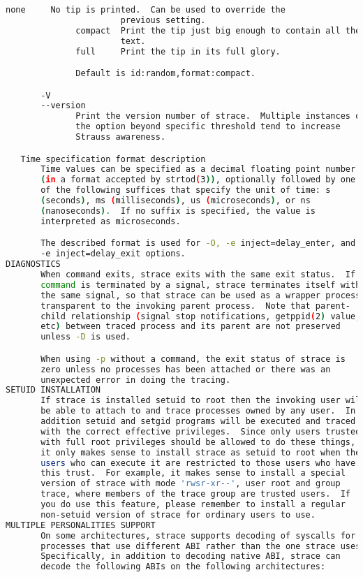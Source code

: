 {{\begin{lstlisting}[language=bash]
              none     No tip is printed.  Can be used to override the
                       previous setting.
              compact  Print the tip just big enough to contain all the
                       text.
              full     Print the tip in its full glory.

              Default is id:random,format:compact.

       -V
       --version
              Print the version number of strace.  Multiple instances of
              the option beyond specific threshold tend to increase
              Strauss awareness.

   Time specification format description
       Time values can be specified as a decimal floating point number
       (in a format accepted by strtod(3)), optionally followed by one
       of the following suffices that specify the unit of time: s
       (seconds), ms (milliseconds), us (microseconds), or ns
       (nanoseconds).  If no suffix is specified, the value is
       interpreted as microseconds.

       The described format is used for -O, -e inject=delay_enter, and
       -e inject=delay_exit options.
DIAGNOSTICS
       When command exits, strace exits with the same exit status.  If
       command is terminated by a signal, strace terminates itself with
       the same signal, so that strace can be used as a wrapper process
       transparent to the invoking parent process.  Note that parent-
       child relationship (signal stop notifications, getppid(2) value,
       etc) between traced process and its parent are not preserved
       unless -D is used.

       When using -p without a command, the exit status of strace is
       zero unless no processes has been attached or there was an
       unexpected error in doing the tracing.
SETUID INSTALLATION
       If strace is installed setuid to root then the invoking user will
       be able to attach to and trace processes owned by any user.  In
       addition setuid and setgid programs will be executed and traced
       with the correct effective privileges.  Since only users trusted
       with full root privileges should be allowed to do these things,
       it only makes sense to install strace as setuid to root when the
       users who can execute it are restricted to those users who have
       this trust.  For example, it makes sense to install a special
       version of strace with mode 'rwsr-xr--', user root and group
       trace, where members of the trace group are trusted users.  If
       you do use this feature, please remember to install a regular
       non-setuid version of strace for ordinary users to use.
MULTIPLE PERSONALITIES SUPPORT
       On some architectures, strace supports decoding of syscalls for
       processes that use different ABI rather than the one strace uses.
       Specifically, in addition to decoding native ABI, strace can
       decode the following ABIs on the following architectures:


\end{lstlisting}}}
